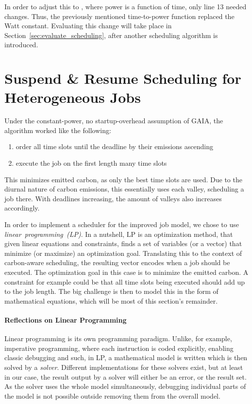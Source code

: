 In order to adjust this to \modelname, where power is a function of time, only line 13 needed changes. 
Thus, the previously mentioned time-to-power function replaced the Watt constant.
Evaluating this change will take place in Section~\ref{sec:evaluate_scheduling}, after another scheduling algorithm is introduced.

\section{{Suspend \& Resume Scheduling for Heterogeneous Jobs}} \label{sec:checkpoint_resume_lp}

Under the constant-power, no startup-overhead assumption of GAIA, the algorithm worked like the following:

\begin{enumerate}
    \item order all time slots until the deadline by their emissions ascending
    \item execute the job on the first length many time slots
\end{enumerate}

This minimizes emitted carbon, as only the best time slots are used.
Due to the diurnal nature of carbon emissions, this essentially uses each valley, scheduling a job there. 
With deadlines increasing, the amount of valleys also increases accordingly.

In order to implement a scheduler for the improved job model, we chose to use \emph{linear~programming~(LP)}.
In a nutshell, LP is an optimization method, that given linear equations and constraints, finds a set of variables (or a vector) that minimize (or maximize) an optimization goal.
Translating this to the context of carbon-aware scheduling, the resulting vector encodes when a job should be executed.
The optimization goal in this case is to minimize the emitted carbon. 
A constraint for example could be that all time slots being executed should add up to the job length. 
The big challenge is then to model this in the form of mathematical equations, which will be most of this section's remainder.

\paragraph{Reflections on Linear Programming}

Linear programming is its own programming paradigm. Unlike, for example, imperative programming, where each instruction is coded explicitly, enabling classic debugging and such, in LP, a mathematical model is written which is then solved by a \emph{solver}. 
Different implementations for these solvers exist, but at least in our case, the result output by a solver will either be an error, or the result set. 
As the solver uses the whole model simultaneously, debugging individual parts of the model is not possible outside removing them from the overall model.

